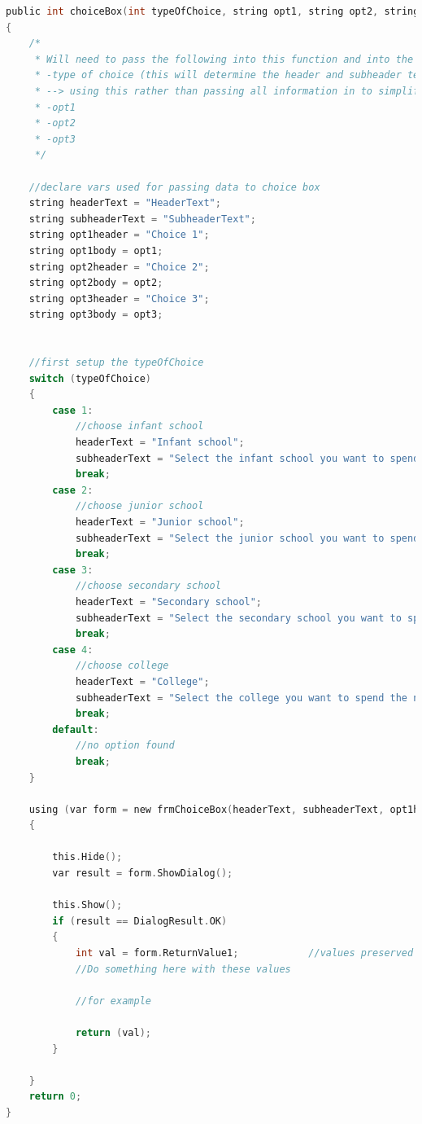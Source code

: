 \begin{lstlisting}[language=c, style=csharp, caption=Random generation of schools code]
public int choiceBox(int typeOfChoice, string opt1, string opt2, string opt3)
{
    /*
     * Will need to pass the following into this function and into the choice box form.
     * -type of choice (this will determine the header and subheader text)
     * --> using this rather than passing all information in to simplifiy calls to this function.
     * -opt1
     * -opt2
     * -opt3
     */

    //declare vars used for passing data to choice box
    string headerText = "HeaderText";
    string subheaderText = "SubheaderText";
    string opt1header = "Choice 1";
    string opt1body = opt1;
    string opt2header = "Choice 2";
    string opt2body = opt2;
    string opt3header = "Choice 3";
    string opt3body = opt3;


    //first setup the typeOfChoice
    switch (typeOfChoice)
    {
        case 1:
            //choose infant school
            headerText = "Infant school";
            subheaderText = "Select the infant school you want to spend the next 3 years at";
            break;
        case 2:
            //choose junior school
            headerText = "Junior school";
            subheaderText = "Select the junior school you want to spend the next 4 years at";
            break;
        case 3:
            //choose secondary school
            headerText = "Secondary school";
            subheaderText = "Select the secondary school you want to spend the next 5 years at";
            break;
        case 4:
            //choose college
            headerText = "College";
            subheaderText = "Select the college you want to spend the next 2 years at";
            break;
        default:
            //no option found
            break;
    }

    using (var form = new frmChoiceBox(headerText, subheaderText, opt1header, opt1body, opt2header, opt2body, opt3header, opt3body))
    {

        this.Hide();
        var result = form.ShowDialog();

        this.Show();
        if (result == DialogResult.OK)
        {
            int val = form.ReturnValue1;            //values preserved after close
            //Do something here with these values

            //for example
            
            return (val);
        }
        
    }
    return 0;
}
\end{lstlisting}

